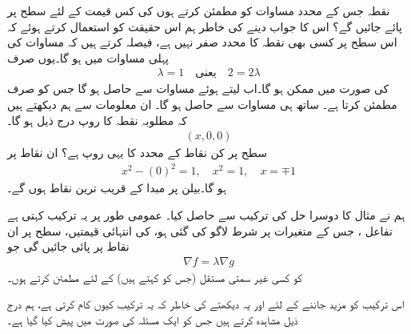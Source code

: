 نقطہ  جس کے محدد  مساوات  کو مطمئن کرتے  ہوں     کی کس قیمت کے لئے سطح  پر پائے جائیں گے؟   اس کا جواب  دینے   کی خاطر ہم اس حقیقت کو  استعمال کرتے ہوئے  کہ  اس سطح پر کسی بھی نقطہ کا  محدد صفر نہیں ہے، فیصلہ کرتے ہیں   کہ مساوات  کی پہلی مساوات میں  ہو گا۔یوں   صرف
\begin{align*}
\lambda=1\quad \text{یعنی}\quad 2=2\lambda
\end{align*}
کی صورت  میں ممکن ہو گا۔اب  لیتے ہوئے مساوات  سے  حاصل ہو گا جس کو صرف  مطمئن کرتا ہے۔ ساتھ ہی  مساوات   سے  حاصل ہو گا۔ ان معلومات سے ہم دیکھتے ہیں کہ مطلوبہ نقطہ  کا روپ درج ذیل ہو گا۔
\begin{align*}
(x,0,0)
\end{align*}
سطح  پر کن  نقاط کے محدد کا یہی  روپ ہے؟ ان نقاط پر
\begin{align*}
x^2-(0)^2=1,\quad x^2=1,\quad x=\mp 1
\end{align*}
ہو گا۔بیلن پر مبدا کے   قریب ترین نقاط  ہوں  گے۔ 

ہم نے مثال  کا دوسرا حل   
 کی ترکیب سے حاصل کیا۔  عمومی طور پر یہ ترکیب کہتی  ہے  تفاعل ،    جس کے متغیرات پر  شرط  لاگو کی گئی ہو،   کی انتہائی قیمتیں،  سطح  پر  ان  نقاط پر پائی جائیں گی جو 
\begin{align*}
\nabla f=\lambda \nabla g
\end{align*}
کو کسی غیر سمتی مستقل  (جس کو  کہتے ہیں)  کے لئے مطمئن کرتے ہوں۔

اس ترکیب  کو مزید جاننے کے لئے  اور یہ  دیکھتے  کی خاطر  کہ  یہ ترکیب کیوں کام کرتی ہے، ہم درج ذیل  مشاہدہ کرتے ہیں جس کو ایک مسئلہ کی صورت میں پیش کیا گیا ہے۔

